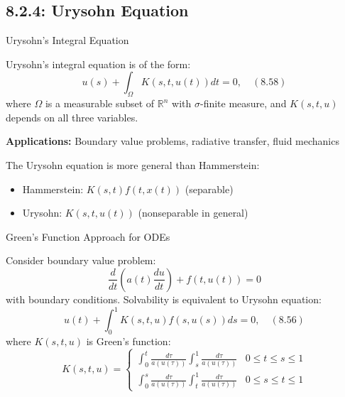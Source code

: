 \documentclass[aspectratio=169,10pt]{beamer}
\begin{document}
\subsection{8.2.4: Urysohn Equation}

\begin{frame}{Urysohn's Integral Equation}
    \begin{definition}
        Urysohn's integral equation is of the form:
        \[
            u(s) + \int_{\Omega} K(s, t, u(t)) dt = 0, \quad (8.58)
        \]
        where $\Omega$ is a measurable subset of $\mathbb{R}^n$ with $\sigma$-finite measure,
        and $K(s, t, u)$ depends on all three variables.
    \end{definition}

    \vspace{0.3cm}
    \textbf{Applications:} Boundary value problems, radiative transfer, fluid mechanics

    \vspace{0.3cm}
    \begin{remark}[Generality]
        The Urysohn equation is more general than Hammerstein:
        \begin{itemize}
            \item Hammerstein: $K(s,t) f(t,x(t))$ (separable)
            \item Urysohn: $K(s,t,u(t))$ (nonseparable in general)
        \end{itemize}
    \end{remark}
\end{frame}

\begin{frame}[fragile]{Green's Function Approach for ODEs}
    \begin{example}
        Consider boundary value problem:
        \[
            \frac{d}{dt}\left(a(t)\frac{du}{dt}\right) + f(t, u(t)) = 0
        \]
        with boundary conditions. Solvability is equivalent to Urysohn equation:
        \[
            u(t) + \int_{0}^{1} K(s, t, u) f(s, u(s)) ds = 0, \quad (8.56)
        \]
        where $K(s, t, u)$ is Green's function:
        \[
            K(s, t, u) = \begin{cases}
                \int_{0}^{t} \frac{d\tau}{a(u(\tau))} \int_{s}^{1} \frac{d\tau}{a(u(\tau))} & 0 \leq t \leq s \leq 1 \\
                \int_{0}^{s} \frac{d\tau}{a(u(\tau))} \int_{t}^{1} \frac{d\tau}{a(u(\tau))} & 0 \leq s \leq t \leq 1
            \end{cases}
        \]
    \end{example}
\end{frame}
\end{document}
